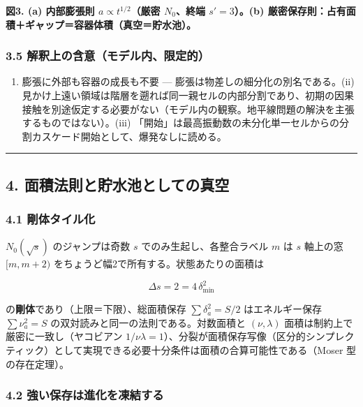 \documentclass[
]{ltjsarticle}
\providecommand{\tightlist}{%
  \setlength{\itemsep}{0pt}\setlength{\parskip}{0pt}}
\begin{document}
\textbf{図3. (a) 内部膨張則 \(a\propto t^{1/2}\)（厳密 \(N_0\)、終端
\(s'=3\)）。(b)
厳密保存則：占有面積＋ギャップ＝容器体積（真空＝貯水池）。}

\subsubsection{3.5
解釈上の含意（モデル内、限定的）}\label{ux89e3ux91c8ux4e0aux306eux542bux610fux30e2ux30c7ux30ebux5185ux9650ux5b9aux7684}

\begin{enumerate}
\def\labelenumi{(\roman{enumi})}
\tightlist
\item
  膨張に外部も容器の成長も不要 ---
  膨張は物差しの細分化の別名である。(ii)
  見かけ上遠い領域は階層を遡れば同一親セルの内部分割であり、初期の因果接触を別途仮定する必要がない（モデル内の観察。地平線問題の解決を主張するものではない）。(iii)
  「開始」は最高振動数の未分化単一セルからの分割カスケード開始として、爆発なしに読める。
\end{enumerate}

\begin{center}\rule{0.5\linewidth}{0.5pt}\end{center}

\subsection{4.
面積法則と貯水池としての真空}\label{ux9762ux7a4dux6cd5ux5247ux3068ux8cafux6c34ux6c60ux3068ux3057ux3066ux306eux771fux7a7a}

\subsubsection{4.1
剛体タイル化}\label{ux525bux4f53ux30bfux30a4ux30ebux5316}

\(N_0(\sqrt s)\) のジャンプは奇数 \(s\) でのみ生起し、各整合ラベル \(m\)
は \(s\) 軸上の窓 \([m,m+2)\)
をちょうど幅2で所有する。状態あたりの面積は

\[
\Delta s=2=4\,\delta_{\min}^2
\]

の\textbf{剛体}であり（上限＝下限）、総面積保存 \(\sum\delta_a^2=S/2\)
はエネルギー保存 \(\sum\nu_a^2=S\)
の双対読みと同一の法則である。対数面積と \((\nu,\lambda)\)
面積は制約上で厳密に一致し（ヤコビアン
\(1/\nu\lambda=1\)）、分裂が面積保存写像（区分的シンプレクティック）として実現できる必要十分条件は面積の合算可能性である（Moser
型の存在定理）。

\subsubsection{4.2
強い保存は進化を凍結する}\label{ux5f37ux3044ux4fddux5b58ux306fux9032ux5316ux3092ux51cdux7d50ux3059ux308b}
\end{document}
